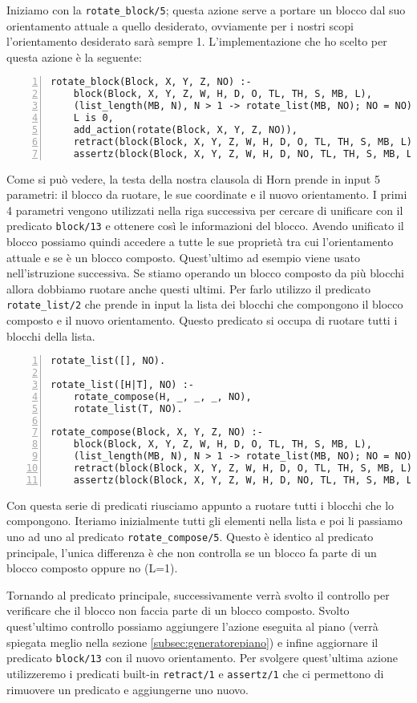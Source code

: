 Iniziamo con la \verb+rotate_block/5+; questa azione serve a portare un blocco dal suo orientamento attuale a quello desiderato, ovviamente per i nostri scopi l'orientamento desiderato sarà sempre 1.
L'implementazione che ho scelto per questa azione è la seguente:
\begin{lstlisting}[numbers=left]
rotate_block(Block, X, Y, Z, NO) :-
    block(Block, X, Y, Z, W, H, D, O, TL, TH, S, MB, L),
    (list_length(MB, N), N > 1 -> rotate_list(MB, NO); NO = NO),
    L is 0,
    add_action(rotate(Block, X, Y, Z, NO)),
    retract(block(Block, X, Y, Z, W, H, D, O, TL, TH, S, MB, L)),
    assertz(block(Block, X, Y, Z, W, H, D, NO, TL, TH, S, MB, L)).
\end{lstlisting}
Come si può vedere, la testa della nostra clausola di Horn prende in input 5 parametri: il blocco da ruotare, le sue coordinate e il nuovo orientamento. I primi 4 parametri vengono utilizzati nella riga successiva per cercare di unificare con il predicato \verb+block/13+ e ottenere così le informazioni del blocco.
Avendo unificato il blocco possiamo quindi accedere a tutte le sue proprietà tra cui l'orientamento attuale e se è un blocco composto. Quest'ultimo ad esempio viene usato nell'istruzione successiva. Se stiamo operando un blocco composto da più blocchi allora dobbiamo ruotare anche questi ultimi. Per farlo utilizzo il predicato \verb+rotate_list/2+ che prende in input la lista dei blocchi che compongono il blocco composto e il nuovo orientamento. Questo predicato si occupa di ruotare tutti i blocchi della lista.
\begin{lstlisting}[numbers=left]
rotate_list([], NO).

rotate_list([H|T], NO) :-
    rotate_compose(H, _, _, _, NO),
    rotate_list(T, NO).

rotate_compose(Block, X, Y, Z, NO) :-
    block(Block, X, Y, Z, W, H, D, O, TL, TH, S, MB, L),
    (list_length(MB, N), N > 1 -> rotate_list(MB, NO); NO = NO),
    retract(block(Block, X, Y, Z, W, H, D, O, TL, TH, S, MB, L)),
    assertz(block(Block, X, Y, Z, W, H, D, NO, TL, TH, S, MB, L)).
\end{lstlisting}
Con questa serie di predicati riusciamo appunto a ruotare tutti i blocchi che lo compongono. Iteriamo inizialmente tutti gli elementi nella lista e poi li passiamo uno ad uno al predicato \verb+rotate_compose/5+. Questo è identico al predicato principale, l'unica differenza è che non controlla se un blocco fa parte di un blocco composto oppure no (L=1).

Tornando al predicato principale, successivamente verrà svolto il controllo per verificare che il blocco non faccia parte di un blocco composto. Svolto quest'ultimo controllo possiamo aggiungere l'azione eseguita al piano (verrà spiegata meglio nella sezione \ref{subsec:generatorepiano}) e infine aggiornare il predicato \verb+block/13+ con il nuovo orientamento.
Per svolgere quest'ultima azione utilizzeremo i predicati built-in \verb+retract/1+ e \verb+assertz/1+ che ci permettono di rimuovere un predicato e aggiungerne uno nuovo.

